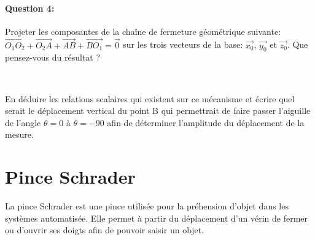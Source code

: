 \paragraph{Question 4:}

Projeter les composantes de la chaîne de fermeture géométrique suivante: $\overrightarrow{O_1O_2}+\overrightarrow{O_2A}+\overrightarrow{AB}+\overrightarrow{BO_1}=\overrightarrow{0}$ sur les trois vecteurs de la base: $\overrightarrow{x_0}$, $\overrightarrow{y_0}$ et $\overrightarrow{z_0}$. Que pensez-vous du résultat ?

~\

En déduire les relations scalaires qui existent sur ce mécanisme et écrire quel serait le déplacement vertical du point B qui permettrait de faire passer l'aiguille de l'angle $\theta=0$ \textdegree à $\theta=-90$ \textdegree afin de déterminer l'amplitude du déplacement de la mesure.

\newpage

\section{Pince Schrader}

La pince Schrader est une pince utilisée pour la préhension d'objet dans les systèmes automatisée. Elle permet à partir du déplacement d'un vérin de fermer ou d'ouvrir ses doigts afin de pouvoir saisir un objet.

